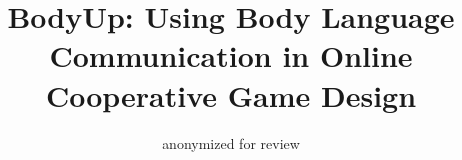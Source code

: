\documentclass{sig-alternate}
\begin{document}
\title{BodyUp: Using Body Language\\ Communication in Online Cooperative Game Design}

\author{
  \alignauthor anonymized for review\\
}

%

\maketitle
\end{document}
